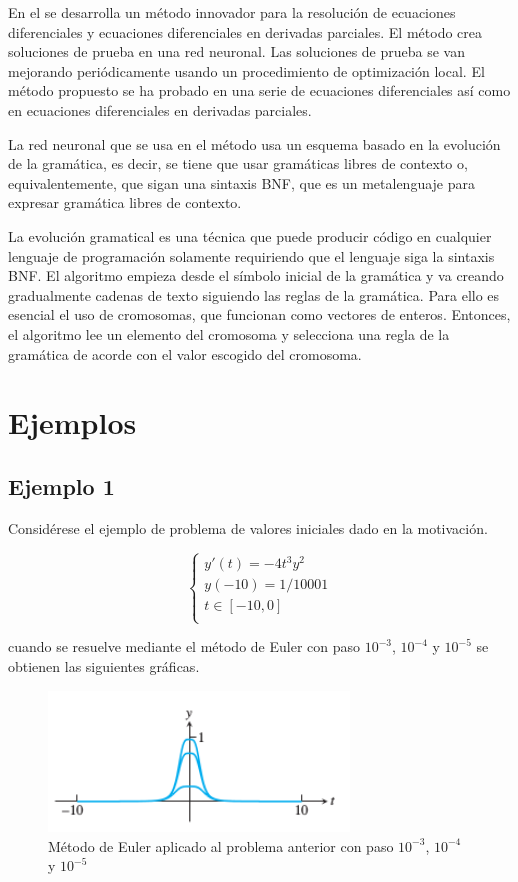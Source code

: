 \documentclass{article}
\theoremstyle{theorem-style}  %
\theoremstyle{definition-style}
\theoremstyle{example-style}
\begin{document}
En el se desarrolla un método innovador para la resolución de ecuaciones diferenciales y ecuaciones diferenciales en derivadas parciales. El método crea soluciones de prueba en una red neuronal. Las soluciones de prueba se van mejorando periódicamente usando un procedimiento de optimización local. El método propuesto se ha probado en una serie de ecuaciones diferenciales así como en ecuaciones diferenciales en derivadas parciales.

La red neuronal que se usa en el método usa un esquema basado en la evolución de la gramática, es decir, se tiene que usar gramáticas libres de contexto o, equivalentemente, que sigan una sintaxis BNF, que es un metalenguaje para expresar gramática libres de contexto.

La evolución gramatical es una técnica que puede producir código en cualquier lenguaje de programación solamente requiriendo que el lenguaje siga la sintaxis BNF. El algoritmo empieza desde el símbolo inicial de la gramática y va creando gradualmente cadenas de texto siguiendo las reglas de la gramática. Para ello  es esencial el uso de cromosomas, que funcionan como vectores de enteros. Entonces, el algoritmo lee un elemento del cromosoma y selecciona una regla de la gramática de acorde con el valor escogido del cromosoma.

\section{Ejemplos} \label{ejemplos}

\subsection{Ejemplo 1} \label{ejemplo1}

Considérese el ejemplo de problema de valores iniciales dado en la motivación.

		\begin{equation*}
			\begin{cases}
			y'(t) = -4 t^3 y^2 \\
			y(-10) = 1/10001 \\
			t \in [-10,0] \\
			\end{cases}
		\end{equation*}

cuando se resuelve mediante el método de Euler con paso $10^{-3}$, $10^{-4}$ y  $10^{-5}$ se obtienen las siguientes gráficas.

		\begin{figure}[H]
			\centering
			\includegraphics[width=8cm]{./Images/ej1-1.png}
			\caption{Método de Euler aplicado al problema anterior con paso $10^{-3}$, $10^{-4}$ y  $10^{-5}$}
			\label{fig:ej1-1}
		\end{figure}
\end{document}
